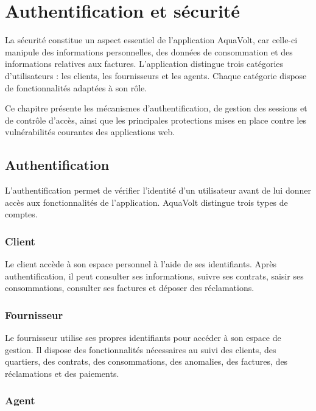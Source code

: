 
\chapter{Authentification et sécurité}
\label{chap:securite}

La sécurité constitue un aspect essentiel de l'application AquaVolt, car celle-ci manipule des informations personnelles, des données de consommation et des informations relatives aux factures. L'application distingue trois catégories d'utilisateurs : les clients, les fournisseurs et les agents. Chaque catégorie dispose de fonctionnalités adaptées à son rôle.

Ce chapitre présente les mécanismes d'authentification, de gestion des sessions et de contrôle d'accès, ainsi que les principales protections mises en place contre les vulnérabilités courantes des applications web.

\section{Authentification}

L'authentification permet de vérifier l'identité d'un utilisateur avant de lui donner accès aux fonctionnalités de l'application. AquaVolt distingue trois types de comptes.

\subsection{Client}

Le client accède à son espace personnel à l'aide de ses identifiants. Après authentification, il peut consulter ses informations, suivre ses contrats, saisir ses consommations, consulter ses factures et déposer des réclamations.

\subsection{Fournisseur}

Le fournisseur utilise ses propres identifiants pour accéder à son espace de gestion. Il dispose des fonctionnalités nécessaires au suivi des clients, des quartiers, des contrats, des consommations, des anomalies, des factures, des réclamations et des paiements.

\subsection{Agent}

